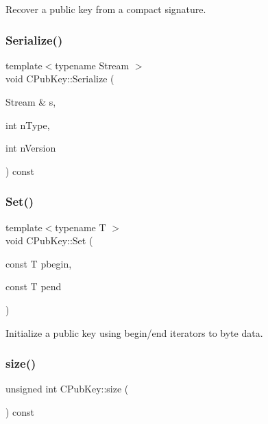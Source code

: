 Recover a public key from a compact signature. 

\mbox{\label{class_c_pub_key_a6003c13fc0a48bae69c2a7ddb1fecc21}} 
\subsubsection{\texorpdfstring{Serialize()}{Serialize()}}
{\footnotesize\ttfamily template$<$typename Stream $>$ \\
void C\+Pub\+Key\+::\+Serialize (\begin{DoxyParamCaption}\item[{Stream \&}]{s,  }\item[{int}]{n\+Type,  }\item[{int}]{n\+Version }\end{DoxyParamCaption}) const\hspace{0.3cm}{\ttfamily [inline]}}

\mbox{\label{class_c_pub_key_af59bc1d3be119c1f8b49d3c1e2c0797b}} 
\subsubsection{\texorpdfstring{Set()}{Set()}}
{\footnotesize\ttfamily template$<$typename T $>$ \\
void C\+Pub\+Key\+::\+Set (\begin{DoxyParamCaption}\item[{const T}]{pbegin,  }\item[{const T}]{pend }\end{DoxyParamCaption})\hspace{0.3cm}{\ttfamily [inline]}}



Initialize a public key using begin/end iterators to byte data. 

\mbox{\label{class_c_pub_key_a6bb28fcf0a5f799c69f5b7269363b309}} 
\subsubsection{\texorpdfstring{size()}{size()}}
{\footnotesize\ttfamily unsigned int C\+Pub\+Key\+::size (\begin{DoxyParamCaption}{ }\end{DoxyParamCaption}) const\hspace{0.3cm}{\ttfamily [inline]}}



